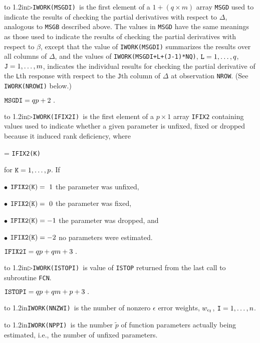 \hangindent\wd\mybox{}\noindent\hbox to
1.2in{$\triangleright$\hfill\tt IWORK(MSGDI) }is the first element of a $1 + (q \times m)$ array {\tt MSGD} used to indicate the results of checking the partial derivatives with respect to $\Delta$, analogous to {\tt MSGB} described above. The values in {\tt MSGD} have the same meanings as those used to indicate the results of checking the partial derivatives with respect to $\beta$, except that the value of {\tt IWORK(MSGDI)} summarizes the results over all columns of $\Delta$, and the values of {\tt IWORK(MSGDI+L+(J-1)*NQ)}, ${\tt L} = 1,\ldots,q$, ${\tt J} = 1,\ldots,m$, indicates the individual results for checking the partial derivative of the {\tt L}th response with respect to the {\tt J}th column of $\Delta$ at observation {\tt NROW}. (See {\tt IWORK(NROWI)} below.)

\aligntobox ${\tt MSGDI} = qp + 2\ .$
\bigskip

\hangindent\wd\mybox{}\noindent\hbox to
1.2in{$\triangleright$\hfill\tt IWORK(IFIX2I) }is the first element of a $p \times 1$ array {\tt IFIX2} containing values used to indicate whether a given parameter is unfixed, fixed or dropped because it induced rank deficiency, where

 = {\tt IFIX2(K)}

{\parindent=1.35in
\aligntobox for ${\tt K} = 1,\ldots,p$. If

\item{$\bullet$} ${\tt IFIX2(K)} =\ 1$ the parameter was unfixed,
\item{$\bullet$} ${\tt IFIX2(K)} =\ 0$ the parameter was fixed,
\item{$\bullet$} ${\tt IFIX2(K)} = -1$ the parameter was dropped, and
\item{$\bullet$} ${\tt IFIX2(K)} = -2$ no parameters were estimated.

\aligntobox ${\tt IFIX2I} = qp + qm + 3\ .$}\bigskip

\hangindent\wd\mybox{}\noindent\hbox to
1.2in{$\triangleright$\hfill\tt IWORK(ISTOPI) }is value of {\tt ISTOP} returned from the last call to subroutine {\tt FCN}.

\aligntobox ${\tt ISTOPI} = qp + qm + p + 3\ .$
\bigskip

\hangindent\wd\mybox{}\noindent\hbox to
1.2in{\hfill\tt IWORK(NNZWI) }is the number of nonzero $\epsilon$ error weights, $w_{\epsilon_{\rm I}}$, ${\tt I} = 1,\ldots,n$.\bigskip

\hangindent\wd\mybox{}\noindent\hbox to
1.2in{\hfill\tt IWORK(NPPI) }is the number $\tilde{p}$ of function parameters actually being estimated, i.e., the number of unfixed parameters.\bigskip

